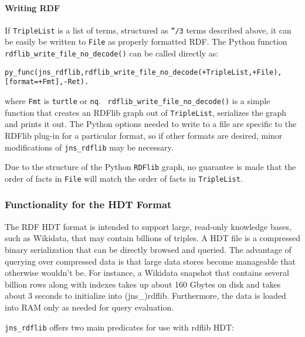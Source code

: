 \paragraph{Writing RDF}

If {\tt TripleList} is a list of terms, structured as {\tt ''/3} terms
described above, it can be easily be written to {\tt File} as properly
formatted RDF.  The Python function {\tt
  rdflib\_write\_file\_no\_decode()} can be called directly as:
\begin{verbatim}
py_func(jns_rdflib,rdflib_write_file_no_decode(+TripleList,+File),[format=+Fmt],-Ret).
\end{verbatim}
where {\tt Fmt} is {\tt turtle} or {\tt nq}.  {\tt
  rdflib\_write\_file\_no\_decode()} is a simple function that creates
an RDFlib graph out of {\tt TripleList}, serializes the graph and
prints it out.  The Python options needed to write to a file are
specific to the RDFlib plug-in for a particular format, so if other
formats are desired, minor modifications of {\tt jns\_rdflib} may be
necessary.

Due to the structure of the Python {\tt RDFlib} graph, no guarantee is
made that the order of facts in {\tt File} will match the order of
facts in {\tt TripleList}.
  
\subsubsection{Functionality for the HDT Format}

The RDF HDT format is intended to support large, read-only knowledge
bases, such as Wikidata, that may contain billions of triples.  A HDT
file is a compressed binary serialization that can be directly browsed
and queried.  The advantage of querying over compressed data is that
large data stores become manageable that otherwise wouldn't be.  For
instance, a Wikidata snapshot that contains several billion rows along
with indexes takes up about 160 Gbytes on disk and takes about 3
seconds to initialize into (jns\_)rdflib.  Furthermore, the data is
loaded into RAM only as needed for query evaluation.  

{\tt jns\_rdflib} offers two main predicates for use with rdflib HDT:

